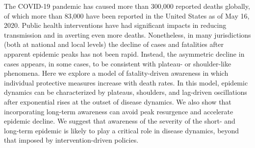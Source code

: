 The COVID-19 pandemic has caused more than 300,000 reported deaths
globally, of which more than 83,000 have been reported
in the United States as of May 16, 2020. Public health interventions
have had significant impacts in reducing transmission and in
averting even more deaths. Nonetheless, in many jurisdictions
(both at national and local levels) the decline of cases and fatalities
after apparent epidemic peaks has not been rapid.  Instead, the asymmetric
decline in cases appears, in some cases, to be consistent
with plateau- or shoulder-like phenomena.  
Here we explore a model of fatality-driven
awareness in which individual protective measures increase
with death rates.  In this model, epidemic dynamics
can be characterized by plateaus, shoulders,
and lag-driven oscillations after exponential rises
at the outset of disease dynamics. We also show that
incorporating long-term awareness can avoid peak resurgence and accelerate
epidemic decline.  We suggest that awareness of the severity of the short- and long-term epidemic is likely to play a critical
role in disease dynamics, beyond that imposed by intervention-driven policies.

